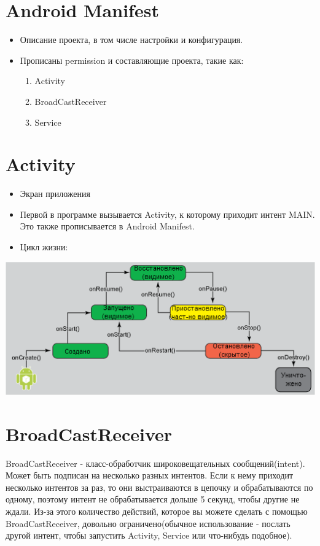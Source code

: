 \documentclass[12 pt]{article}
\begin{document}
\section{Android Manifest}
    \begin{itemize}
    	\item Описание проекта, в том числе настройки и конфигурация.
    	\item Прописаны permission и составляющие проекта, такие как:
		\begin{enumerate}
        	\item Activity 
        	\item BroadCastReceiver 
        	\item Service
        \end{enumerate}
    \end{itemize}

\section{Activity}
    \begin{itemize}
    	\item Экран приложения
        \item Первой в программе вызывается Activity, к которому приходит интент MAIN. Это также прописывается в Android Manifest.
    	\item Цикл жизни:
   	\end{itemize}
	\includegraphics{LifeCycle.png}
    
\section{BroadCastReceiver} 
    
    BroadCastReceiver - класс-обработчик широковещательных сообщений(intent). Может быть подписан на несколько разных интентов. Если к нему приходит несколько интентов за раз, то они выстраиваются в цепочку и обрабатываются по одному, поэтому интент не обрабатывается дольше 5 секунд, чтобы другие не ждали. Из-за этого количество действий, которое вы можете сделать с помощью BroadCastReceiver, довольно ограничено(обычное использование - послать другой интент, чтобы запустить Activity, Service или что-нибудь подобное).
    
\end{document}
